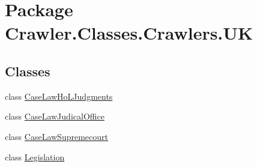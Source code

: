 \hypertarget{namespace_crawler_1_1_classes_1_1_crawlers_1_1_u_k}{\section{Package Crawler.\-Classes.\-Crawlers.\-U\-K}
\label{namespace_crawler_1_1_classes_1_1_crawlers_1_1_u_k}
}
\subsection*{Classes}
\begin{DoxyCompactItemize}
\item 
class \hyperlink{class_crawler_1_1_classes_1_1_crawlers_1_1_u_k_1_1_case_law_ho_l_judgments}{Case\-Law\-Ho\-L\-Judgments}
\item 
class \hyperlink{class_crawler_1_1_classes_1_1_crawlers_1_1_u_k_1_1_case_law_judical_office}{Case\-Law\-Judical\-Office}
\item 
class \hyperlink{class_crawler_1_1_classes_1_1_crawlers_1_1_u_k_1_1_case_law_supremecourt}{Case\-Law\-Supremecourt}
\item 
class \hyperlink{class_crawler_1_1_classes_1_1_crawlers_1_1_u_k_1_1_legislation}{Legislation}
\end{DoxyCompactItemize}
